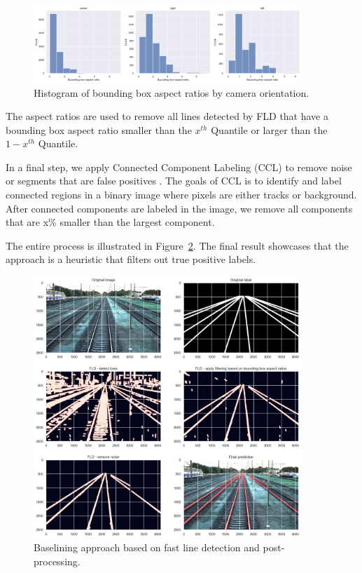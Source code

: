 \documentclass[Master,MDS,english]{BASE/twbook} %
\begin{document}
\begin{figure}[h]
\centering
\includegraphics[width=0.9\textwidth]{images/datasets/db/bb_ascpect_ratio_hist}
\caption{Histogram of bounding box aspect ratios by camera orientation. }
\label{fig:bb_aspect_ratio_hist}
\end{figure}

The aspect ratios are used to remove all lines detected by FLD that have a bounding box aspect ratio smaller than the $x^{th}$ Quantile or larger than the $1-x^{th}$ Quantile.

In a final step, we apply Connected Component Labeling (CCL) to remove noise or segments that are false positives \citep{CCL}. 
The goals of CCL is to identify and label connected regions in a binary image where pixels are either tracks or background. After connected components are labeled in the image, we remove all components that are x\% smaller than the largest component.

The entire process is illustrated in Figure~\ref{fig:fld_demo}. The final result showcases that the approach is a heuristic that filters out true positive labels.

\begin{figure}[h]
\centering
\includegraphics[width=0.9\textwidth]{images/fld/fld_demo}
\caption{Baselining approach based on fast line detection and post-processing. }
\label{fig:fld_demo}
\end{figure}
\end{document}
